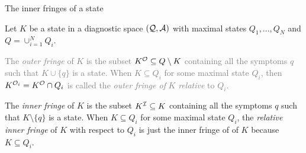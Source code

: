 \documentclass{beamer}
\def\tl{\vskip 2mm}
\def\itvvs{\vspace{-.15cm}\item}
\def\SB{\subseteq}
\def\AAA{{\cal A}}
\def\III{{\cal I}}
\def\OOO{{\cal O}}
\def\QQQ{{\cal Q}}
\def\gtxt#1{\textcolor{gray}{#1}}
\begin{document}
\begin{frame}{The inner fringes of a state}

\begin{definition}\label{def_in_out_diag} Let $K$ be a state in   a diagnostic space $(\QQQ,\AAA)$ with maximal states $Q_1,...,Q_N$ and $Q=\cup_{i=1}^N Q_i$.
\tl
\begin{roster}
  \itvvs 
\gtxt{ The  {\sl outer fringe} of $K$ is  the subset $K^\OOO\SB Q\setminus K$ containing all the symptoms $q$ such that $K\cup \{q\}$ is a state. When $K\SB Q_i$ for some maximal state $Q_i$, then $K^{\OOO_i} = K^\OOO\cap Q_i$ is called the {\sl outer fringe of} $K$ {\sl relative} to 
 $Q_i$. 
 }
 \tl
  \itvvs The {\sl inner fringe} of $K$ is  the subset $K^\III\SB K$ containing all the symptoms $q$ such that $K\setminus \{q\}$ is a state. When  $K\SB Q_i$ for some maximal state $Q_i$, the {\sl relative inner fringe} of $K$ with respect to $Q_i$ is just the inner fringe of of $K$ because $K\SB Q_i$.
 \end{roster} 
 \end{definition} 
  \vspace{.5cm}

\end{frame}
\end{document}
